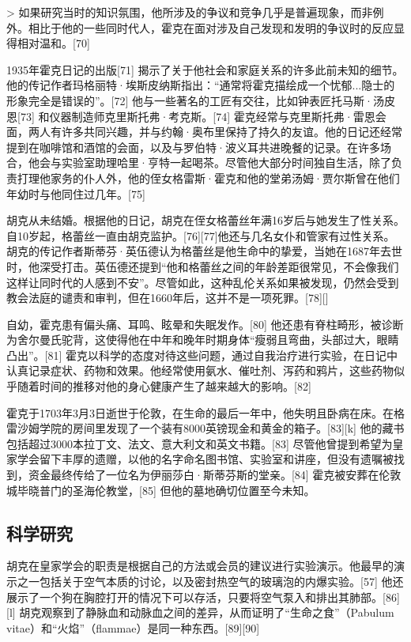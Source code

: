 > 如果研究当时的知识氛围，他所涉及的争议和竞争几乎是普遍现象，而非例外。相比于他的一些同时代人，霍克在面对涉及自己发现和发明的争议时的反应显得相对温和。[70]

1935年霍克日记的出版[71] 揭示了关于他社会和家庭关系的许多此前未知的细节。他的传记作者玛格丽特·埃斯皮纳斯指出：“通常将霍克描绘成一个忧郁...隐士的形象完全是错误的”。[72] 他与一些著名的工匠有交往，比如钟表匠托马斯·汤皮恩[73] 和仪器制造师克里斯托弗·考克斯。[74] 霍克经常与克里斯托弗·雷恩会面，两人有许多共同兴趣，并与约翰·奥布里保持了持久的友谊。他的日记还经常提到在咖啡馆和酒馆的会面，以及与罗伯特·波义耳共进晚餐的记录。在许多场合，他会与实验室助理哈里·亨特一起喝茶。尽管他大部分时间独自生活，除了负责打理他家务的仆人外，他的侄女格雷斯·霍克和他的堂弟汤姆·贾尔斯曾在他们年幼时与他同住过几年。[75]

胡克从未结婚。根据他的日记，胡克在侄女格蕾丝年满16岁后与她发生了性关系。自10岁起，格蕾丝一直由胡克监护。[76][77]他还与几名女仆和管家有过性关系。胡克的传记作者斯蒂芬·英伍德认为格蕾丝是他生命中的挚爱，当她在1687年去世时，他深受打击。英伍德还提到“他和格蕾丝之间的年龄差距很常见，不会像我们这样让同时代的人感到不安”。尽管如此，这种乱伦关系如果被发现，仍然会受到教会法庭的谴责和审判，但在1660年后，这并不是一项死罪。[78][]

自幼，霍克患有偏头痛、耳鸣、眩晕和失眠发作。[80] 他还患有脊柱畸形，被诊断为舍尔曼氏驼背，这使得他在中年和晚年时期身体“瘦弱且弯曲，头部过大，眼睛凸出”。[81] 霍克以科学的态度对待这些问题，通过自我治疗进行实验，在日记中认真记录症状、药物和效果。他经常使用氨水、催吐剂、泻药和鸦片，这些药物似乎随着时间的推移对他的身心健康产生了越来越大的影响。[82]

霍克于1703年3月3日逝世于伦敦，在生命的最后一年中，他失明且卧病在床。在格雷沙姆学院的房间里发现了一个装有8000英镑现金和黄金的箱子。[83][k] 他的藏书包括超过3000本拉丁文、法文、意大利文和英文书籍。[83] 尽管他曾提到希望为皇家学会留下丰厚的遗赠，以他的名字命名图书馆、实验室和讲座，但没有遗嘱被找到，资金最终传给了一位名为伊丽莎白·斯蒂芬斯的堂亲。[84] 霍克被安葬在伦敦城毕晓普门的圣海伦教堂，[85] 但他的墓地确切位置至今未知。
\subsection{科学研究}  
胡克在皇家学会的职责是根据自己的方法或会员的建议进行实验演示。他最早的演示之一包括关于空气本质的讨论，以及密封热空气的玻璃泡的内爆实验。[57] 他还展示了一个狗在胸腔打开的情况下可以存活，只要将空气泵入和排出其肺部。[86][l] 胡克观察到了静脉血和动脉血之间的差异，从而证明了“生命之食”（Pabulum vitae）和“火焰”（flammae）是同一种东西。[89][90]  

